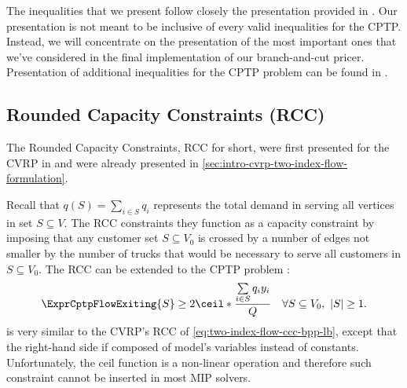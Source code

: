 The inequalities that we present follow closely the presentation provided in \textcite{jepsen2014}.
Our presentation is not meant to be inclusive of every valid inequalities for the CPTP.
Instead, we will concentrate on the presentation of the most important ones
that we've considered in the final implementation of our branch-and-cut pricer.
Presentation of additional inequalities for the CPTP problem can be found in \textcite{jepsen2014}.

\subsection{Rounded Capacity Constraints (RCC)}
\label{sec:cptp-rcc}

The Rounded Capacity Constraints, RCC for short, were first presented
for the CVRP  in \textcite{laporte1983}
and were already presented in \cref{sec:intro-cvrp-two-index-flow-formulation}.

Recall that $q(S) = \sum_{i \in S} q_i$ represents
the total demand in serving all vertices in set $S \subseteq V$.
The RCC constraints they function as a capacity constraint
by imposing that any customer set $S \subseteq V_0$ is crossed by a number of edges
not smaller by the number of trucks that would be necessary to serve all customers in $S \subseteq V_0$.
The RCC can be extended to the CPTP problem \parencite{jepsen2014}:
\begin{equation}
	\label{eq:cptp-rcc-inequality-original}
	\ExprCptpFlowExiting{S} \ge 2 \ceil*{\frac{\sum\limits_{i \in S} q_i y_i}{Q}} \quad \forall S \subseteq V_0,\ |S| \ge 1.
\end{equation}
is very similar to the CVRP's RCC of \cref{eq:two-index-flow-ccc-bpp-lb},
except that the right-hand side if composed of model's variables instead of constants.
Unfortunately, the ceil function is a non-linear operation and therefore
such constraint cannot be inserted in most MIP solvers.

